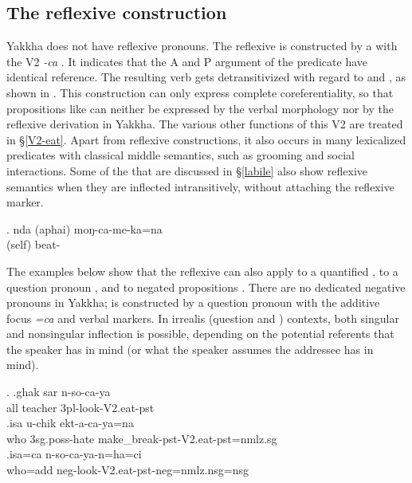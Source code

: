 \subsection{The reflexive construction}\label{refl}

Yakkha does not have reflexive pronouns. The reflexive is constructed by a  with the V2 \emph{-ca} . It indicates that the A and P argument of the predicate have identical reference.  The resulting verb gets detransitivized with regard to  and , as shown in \Next. This construction can only express complete coreferentiality, so that propositions like  can neither be expressed by the verbal morphology nor by the reflexive derivation  in Yakkha.
The various other functions of this V2 are treated in §\ref{V2-eat}. Apart from reflexive constructions, it also occurs in many lexicalized predicates with classical middle semantics, such as grooming and social interactions. Some of the  that are discussed in §\ref{labile} also show reflexive semantics when they are inflected intransitively, without attaching the reflexive marker. 

\exg. nda (aphai) moŋ-ca-me-ka=na\\
 (self) beat-\\


The examples below show that the reflexive can also apply to a quantified  \Next[a], to a question pronoun \Next[b], and to negated propositions \Next[c]. There are no dedicated negative pronouns in Yakkha;  is constructed by a question pronoun with the additive focus  \emph{=ca} and verbal  markers. In irrealis (question and ) contexts, both singular and nonsingular inflection is possible, depending on the potential referents that the speaker has in mind (or what the speaker assumes the addressee has in mind).

\ex. \ag.ghak sar n-so-ca-ya\\
		all teacher {\sc 3pl}-look-{\sc V2.eat-pst}\\
 	\bg.\label{uchik}isa u-chik ekt-a-ca-ya=na \\
	who {\sc 3sg.poss}-hate make\_break{\sc [3sg]-pst-V2.eat-pst=nmlz.sg} 	\\
	 \bg.isa=ca n-so-ca-ya-n=ha=ci \\
	who{\sc =add}  {\sc neg}-look-{\sc V2.eat-pst-neg=nmlz.nsg=nsg}	\\


